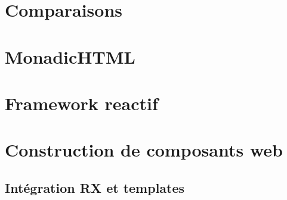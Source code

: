 \section{Comparaisons}
\section{MonadicHTML}

\section{Framework reactif}

\section{Construction de composants web}
\subsection{Intégration RX et templates}